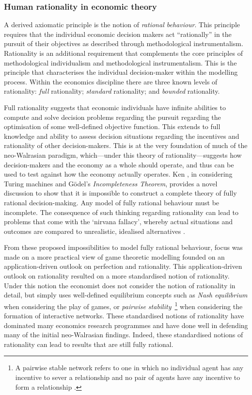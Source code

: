 \subsubsection{Human rationality in economic theory}

A derived axiomatic principle is the notion of \emph{rational behaviour}. This principle requires that the individual economic decision makers act ``rationally'' in the pursuit of their objectives as described through methodological instrumentalism. Rationality is an additional requirement that complements the core principles of methodological individualism and methodological instrumentalism. This is the principle that characterises the individual decision-maker within the modelling process. Within the economics discipline there are three known levels of rationality: \emph{full} rationality; \emph{standard} rationality; and \emph{bounded} rationality.

Full rationality suggests that economic individuals have infinite abilities to compute and solve decision problems regarding the pursuit regarding the optimisation of some well-defined objective function. This extends to full knowledge and ability to assess decision situations regarding the incentives and rationality of other decision-makers. This is at the very foundation of much of the neo-Walrasian paradigm, which---under this theory of rationality---suggests how decision-makers and the economy as a whole should operate, and thus can be used to test against how the economy actually operates. Ken \citet{Binmore1987a, Binmore1987b}, in considering Turing machines and G\"{o}del's \emph{Incompleteness Theorem}, provides a novel discussion to show that it is impossible to construct a complete theory of fully rational decision-making. Any model of fully rational behaviour must be incomplete. The consequence of such thinking regarding rationality can lead to problems that come with the `nirvana fallacy', whereby actual situations and outcomes are compared to unrealistic, idealised alternatives \citep{Demsetz1969}.

From these proposed impossibilities to model fully rational behaviour, focus was made on a more practical view of game theoretic modelling founded on an application-driven outlook on perfection and rationality. This application-driven outlook on rationality resulted on a more standardised notion of rationality. Under this notion the economist does not consider the notion of rationality in detail, but simply uses well-defined equilibrium concepts such as \emph{Nash equilibrium} \citep{Nash1951} when considering the play of games, or \emph{pairwise stability}~\footnote{A pairwise stable network refers to one in which no individual agent has any incentive to sever a relationship and no pair of agents have any incentive to form a relationship \citep{JacksonWolinsky1996, JacksonWatts2002WP}.} when considering the formation of interactive networks. These standardised notions of rationality have dominated many economics research programmes and have done well in defending many of the initial neo-Walrasian findings. Indeed, these standardised notions of rationality can lead to results that are still fully rational.

